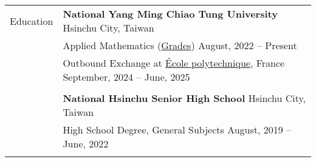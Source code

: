 \documentclass[letterpaper, 11pt]{article}
\begin{document}
\begin{center}
    \begin{longtable}{p{0.76in}p{5.93in}}

        
        
        
        \textcolor{OliveGreen}{Education} 
        & \textbf{National Yang Ming Chiao Tung University} \hfill Hsinchu City, Taiwan \\ 
        & Applied Mathematics (\href{https://docs.google.com/spreadsheets/d/1hz9FwNdFio4EajAw5VN3lpa6QyxIE2GJ6FpHmMoSaaQ/edit?usp=sharing}{Grades}) \hfill August, 2022 -- Present \\
        & \qquad Outbound Exchange at \href{https://www.polytechnique.edu}{\'Ecole polytechnique}, France \hfill September, 2024 -- June, 2025 \\
        & \\
        
        & \textbf{National Hsinchu Senior High School} \hfill Hsinchu City, Taiwan \\
        & High School Degree, General Subjects \hfill August, 2019 -- June, 2022\\
        & \\
        
        

\end{longtable}
\end{center}
\end{document}
